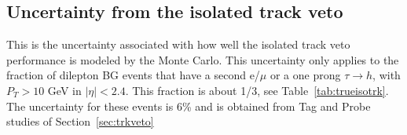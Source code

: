 %
%
%

\subsection{Uncertainty from the isolated track veto}
This is the uncertainty associated with how well the isolated track
veto performance is modeled by the Monte Carlo.  This uncertainty
only applies to the fraction of dilepton BG events that have 
a second e/$\mu$ or a one prong $\tau \to h$, with 
$P_T > 10$ GeV in $|\eta| < 2.4$.  This fraction is about 1/3, see 
Table~\ref{tab:trueisotrk}.
The uncertainty for these events
is 6\% and is obtained from Tag and Probe studies of Section~\ref{sec:trkveto}

